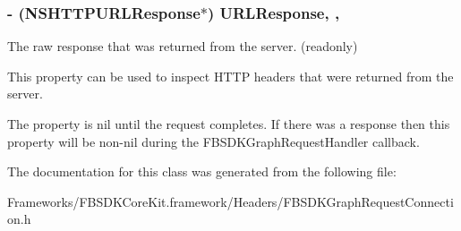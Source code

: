 \subsubsection[{U\+R\+L\+Response}]{\setlength{\rightskip}{0pt plus 5cm}-\/ (N\+S\+H\+T\+T\+P\+U\+R\+L\+Response$\ast$) U\+R\+L\+Response\hspace{0.3cm}{\ttfamily [read]}, {\ttfamily [nonatomic]}, {\ttfamily [retain]}}\label{interface_f_b_s_d_k_graph_request_connection_a5179644ed8074f7e45e664c6ec5b17ab}
The raw response that was returned from the server. (readonly)

This property can be used to inspect H\+T\+T\+P headers that were returned from the server.

The property is nil until the request completes. If there was a response then this property will be non-\/nil during the F\+B\+S\+D\+K\+Graph\+Request\+Handler callback. 

The documentation for this class was generated from the following file\+:\begin{DoxyCompactItemize}
\item 
Frameworks/\+F\+B\+S\+D\+K\+Core\+Kit.\+framework/\+Headers/F\+B\+S\+D\+K\+Graph\+Request\+Connection.\+h\end{DoxyCompactItemize}
